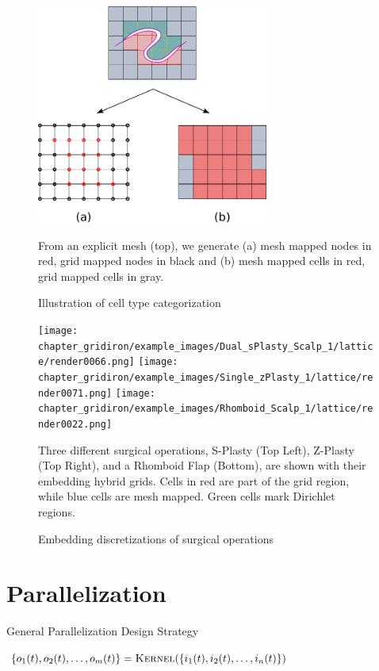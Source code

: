 \begin{figure}
  \centering

  \includegraphics[width=3in]{chapter_gridiron/images/Figure_Topology_D}

  \caption{Illustration of cell type categorization}{From an explicit mesh (top), we generate (a) mesh mapped nodes in red, grid mapped nodes in black and (b) mesh mapped cells in red, grid mapped cells in gray.}
  \label{fig:remapping}
\end{figure}

\begin{figure}
  \centering
  \texttt{[image: chapter\_gridiron/example\_images/Dual\_sPlasty\_Scalp\_1/lattice/render0066.png]}
  \texttt{[image: chapter\_gridiron/example\_images/Single\_zPlasty\_1/lattice/render0071.png]}
  \texttt{[image: chapter\_gridiron/example\_images/Rhomboid\_Scalp\_1/lattice/render0022.png]}
  \caption{Embedding discretizations of surgical operations}{Three
    different surgical operations, S-Plasty (Top Left), Z-Plasty (Top
    Right), and a Rhomboid Flap (Bottom), are shown with their
    embedding hybrid grids. Cells in red are part of the grid region, while
    blue cells are mesh mapped. Green cells mark Dirichlet regions.}
  \label{fig:surgicalembeddings}
\end{figure}

\section{Parallelization}

\begin{algorithm}
  \caption{General Parallelization Design Strategy}
  \label{alg:GeneralStrategy}
  \begin{algorithmic}[1]


    \State $\{ o_1(t), o_2(t),\ldots, o_m(t) \} = \Call{Kernel}{\{ i_1(t), i_2(t),\ldots, i_n(t) \}}$
    
    \EndFor
    
  \end{algorithmic}
  
\end{algorithm}



